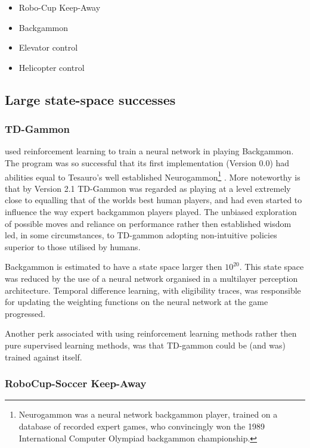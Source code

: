 \documentclass{rucsthesis}
\begin{document}
\begin{itemize}
\item{Robo-Cup Keep-Away \citep{keepaway}}
\item{Backgammon \citep{tdgammon}}
\item{Elevator control \citep{elevator}}
\item{Helicopter control}
\end{itemize}

\subsection{Large state-space successes}

\subsubsection{TD-Gammon}

 \cite{tdgammon} used reinforcement learning to train a neural network in playing Backgammon. The program was so successful that its first implementation (Version 0.0) had abilities equal to Tesauro's well established Neurogammon\footnote{Neurogammon was a neural network backgammon player, trained on a database of recorded expert games, who convincingly won the 1989 International Computer Olympiad backgammon championship.} \citep{tdgammon}.  More noteworthy is that by Version 2.1 TD-Gammon was regarded as playing at a level extremely close to equalling that of the worlds best human players, and had even started to influence the way expert backgammon players played\citep{tdgammon}. The unbiased exploration of possible moves and reliance on performance rather then established wisdom led, in some circumstances, to TD-gammon adopting non-intuitive policies superior to those utilised by humans\citep{tdgammon}.

Backgammon is estimated to have a state space larger then $10^{20}$. This state space was reduced by the use of a neural network organised in a multilayer perception architecture. Temporal difference learning, with eligibility traces, was responsible for updating the weighting functions on the neural network at the game progressed. 

Another perk associated with using reinforcement learning methods rather then pure supervised learning methods, was that TD-gammon could be (and was) trained against itself\citep{tdgammon}.

\subsubsection{RoboCup-Soccer Keep-Away}
\end{document}
